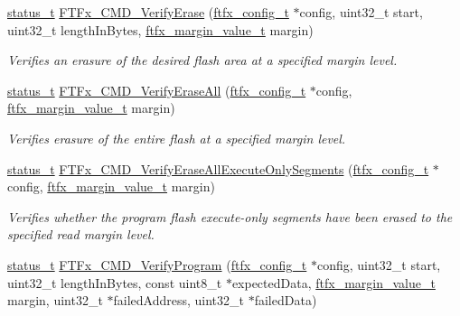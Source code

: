 \begin{DoxyCompactItemize}
\item 
\mbox{\hyperlink{group__ksdk__common_gaaabdaf7ee58ca7269bd4bf24efcde092}{status\+\_\+t}} \mbox{\hyperlink{group__ftfx__controller_gab19822bcb2eafc218a4fd198bf1470da}{F\+T\+Fx\+\_\+\+C\+M\+D\+\_\+\+Verify\+Erase}} (\mbox{\hyperlink{group__ftfx__controller_gab0196063c05bffb4cd2f249699a3378c}{ftfx\+\_\+config\+\_\+t}} $\ast$config, uint32\+\_\+t start, uint32\+\_\+t length\+In\+Bytes, \mbox{\hyperlink{group__ftfx__controller_ga2cef5154a854c303445b4bd5139f6392}{ftfx\+\_\+margin\+\_\+value\+\_\+t}} margin)
\begin{DoxyCompactList}\small\item\em Verifies an erasure of the desired flash area at a specified margin level. \end{DoxyCompactList}\item 
\mbox{\hyperlink{group__ksdk__common_gaaabdaf7ee58ca7269bd4bf24efcde092}{status\+\_\+t}} \mbox{\hyperlink{group__ftfx__controller_ga9432d3fcd2f3222b79e0ea99d7a80043}{F\+T\+Fx\+\_\+\+C\+M\+D\+\_\+\+Verify\+Erase\+All}} (\mbox{\hyperlink{group__ftfx__controller_gab0196063c05bffb4cd2f249699a3378c}{ftfx\+\_\+config\+\_\+t}} $\ast$config, \mbox{\hyperlink{group__ftfx__controller_ga2cef5154a854c303445b4bd5139f6392}{ftfx\+\_\+margin\+\_\+value\+\_\+t}} margin)
\begin{DoxyCompactList}\small\item\em Verifies erasure of the entire flash at a specified margin level. \end{DoxyCompactList}\item 
\mbox{\hyperlink{group__ksdk__common_gaaabdaf7ee58ca7269bd4bf24efcde092}{status\+\_\+t}} \mbox{\hyperlink{group__ftfx__controller_ga849d873f9ab962160ebc2e72429fd3ea}{F\+T\+Fx\+\_\+\+C\+M\+D\+\_\+\+Verify\+Erase\+All\+Execute\+Only\+Segments}} (\mbox{\hyperlink{group__ftfx__controller_gab0196063c05bffb4cd2f249699a3378c}{ftfx\+\_\+config\+\_\+t}} $\ast$config, \mbox{\hyperlink{group__ftfx__controller_ga2cef5154a854c303445b4bd5139f6392}{ftfx\+\_\+margin\+\_\+value\+\_\+t}} margin)
\begin{DoxyCompactList}\small\item\em Verifies whether the program flash execute-\/only segments have been erased to the specified read margin level. \end{DoxyCompactList}\item 
\mbox{\hyperlink{group__ksdk__common_gaaabdaf7ee58ca7269bd4bf24efcde092}{status\+\_\+t}} \mbox{\hyperlink{group__ftfx__controller_ga2c7e08713a560fbc4acff9f7d7708cee}{F\+T\+Fx\+\_\+\+C\+M\+D\+\_\+\+Verify\+Program}} (\mbox{\hyperlink{group__ftfx__controller_gab0196063c05bffb4cd2f249699a3378c}{ftfx\+\_\+config\+\_\+t}} $\ast$config, uint32\+\_\+t start, uint32\+\_\+t length\+In\+Bytes, const uint8\+\_\+t $\ast$expected\+Data, \mbox{\hyperlink{group__ftfx__controller_ga2cef5154a854c303445b4bd5139f6392}{ftfx\+\_\+margin\+\_\+value\+\_\+t}} margin, uint32\+\_\+t $\ast$failed\+Address, uint32\+\_\+t $\ast$failed\+Data)

\end{DoxyCompactItemize}
